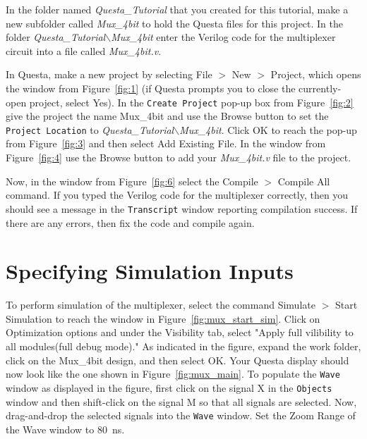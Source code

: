 \documentclass[11pt, twoside, pdftex]{article}
\begin{document}
In the folder named {\it Questa\_Tutorial} that you created for this tutorial, make a new
subfolder called {\it Mux\_4bit} to hold the Questa files for this project.
In the folder {\it Questa\_Tutorial$\backslash$Mux\_4bit} enter the Verilog code for 
the multiplexer circuit into a file called {\it Mux\_4bit.v}.

In Questa, make a new project by selecting {\sf File $>$ New $>$ Project}, which opens the window 
from Figure~\ref{fig:1} (if Questa prompts you to close the currently-open project, 
select {\sf Yes}).  In the \texttt{Create Project} pop-up box from Figure~\ref{fig:2} give 
the project the name {\sf Mux\_4bit} and use the {\sf Browse} button to set the 
\texttt{Project Location} to {\it Questa\_Tutorial$\backslash$Mux\_4bit}. 
Click {\sf OK} to reach the pop-up from Figure~\ref{fig:3} and then select 
{\sf Add Existing File}. In the window from Figure~\ref{fig:4} use the {\sf Browse} button 
to add your {\it Mux\_4bit.v} file to the project. 

Now, in the window from Figure~\ref{fig:6} select the {\sf Compile $>$ Compile All} command.
If you typed the Verilog code for the multiplexer correctly, then you should see a message in the
\texttt{Transcript} window reporting compilation success. If there are any errors, then fix 
the code and compile again.

\section{Specifying Simulation Inputs}

To perform simulation of the multiplexer, select the command {\sf Simulate $>$ Start Simulation}
to reach the window in Figure~\ref{fig:mux_start_sim}. Click on Optimization options and under the Visibility tab, select "Apply full vilibility to all modules(full debug mode)." As indicated in the figure, expand the 
{\sf work} folder, click on the {\sf Mux\_4bit} design, and then select {\sf OK}. Your Questa
display should now look like the one shown in Figure~\ref{fig:mux_main}. To populate the 
\texttt{Wave} window as displayed in the figure, first click on the signal {\sf X} in the 
\texttt{Objects} window and then shift-click on the signal {\sf M} so that all signals are selected.
Now, drag-and-drop the selected signals into the \texttt{Wave} window. Set the {\sf Zoom Range} 
of the Wave window to 80~ns.
~\\
\end{document}
